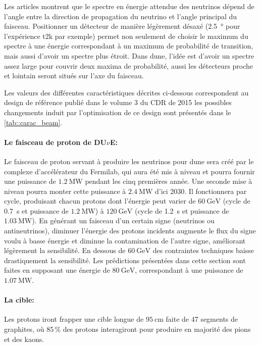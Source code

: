       Les articles \cite{Levy2010,McDonald2001,Itow2001} montrent que le spectre en énergie attendue des neutrinos dépend de l'angle entre la direction de propagation du neutrino et l'angle principal du faisceau. Positionner un détecteur de manière légèrement désaxé (\SI{2.5}{\degree} pour l'expérience \gls{t2k} par exemple) permet non seulement de choisir le maximum du spectre à une énergie correspondant à un maximum de probabilité de transition, mais aussi d'avoir un spectre plus étroit. Dans \gls{dune}, l'idée est d'avoir un spectre assez large pour couvrir deux maxima de probabilité, aussi les détecteurs proche et lointain seront situés sur l'axe du faisceau.

      Les valeurs des différentes caractéristiques décrites ci-dessous correspondent au design de référence publié dans le volume 3 du CDR de 2015\cite{Strait2016} les possibles changements induit par l'optimisation de ce design sont présentés dans le \autoref{tab::carac_beam}.
        
      \paragraph{Le faisceau de proton de DU$\nu$E:} Le faisceau de proton servant à produire les neutrinos pour \gls{dune} sera créé par le complexe d'accélérateur du Fermilab, qui aura été mis à niveau et pourra fournir une puissance de $\SI{1.2}{\mega\watt}$ pendant les cinq premières année. Une seconde mise à niveau pourra monter cette puissance à $\SI{2.4}{\mega\watt}$ d'ici 2030. Il fonctionnera par cycle, produisant chacun  protons dont l'énergie peut varier de $\SI{60}{\giga\electronvolt}$ (cycle de \SI{0.7}{\second} et puissance de $\SI{1.2}{\mega\watt}$)  à $\SI{120}{\giga\electronvolt}$ (cycle de \SI{1.2}{\second} et puissance de $\SI{1.03}{\mega\watt}$). En générant un faisceau d'un certain signe (neutrinos ou antineutrinos), diminuer l'énergie des protons incidents augmente le flux du signe voulu à basse énergie et diminue la contamination de l'autre signe, améliorant légèrement la sensibilité. En dessous de $\SI{60}{\giga\electronvolt}$ des contraintes techniques baisse drastiquement la sensibilité\cite{Collaboration2015}. Les prédictions présentées dans cette section sont faites en supposant une énergie de $\SI{80}{\giga\electronvolt}$, correspondant à une puissance de $\SI{1.07}{\mega\watt}$.
        
      \paragraph{La cible:} Les protons iront frapper une cible longue de $\SI{95}{\centi\meter}$ faite de 47 segments de graphites, où 85\,\% des protons interagiront pour produire en majorité des pions et des kaons. 
        
